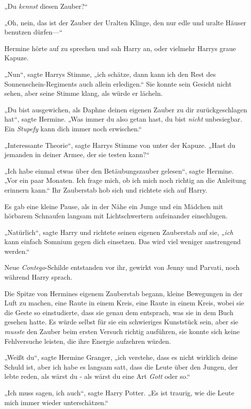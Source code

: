 {„Du \emph{kennst} diesen Zauber?“

„Oh, nein, das ist der Zauber der Uralten Klinge, den nur edle und uralte Häuser benutzen dürfen—“

Hermine hörte auf zu sprechen und sah Harry an, oder vielmehr Harrys graue Kapuze.

„Nun“, sagte Harrys Stimme, „ich schätze, dann kann ich den Rest des Sonnenschein-Regiments auch allein erledigen.“ Sie konnte sein Gesicht nicht sehen, aber seine Stimme klang, als würde er lächeln.

„Du bist ausgewichen, als Daphne deinen eigenen Zauber zu dir zurückgeschlagen hat“, sagte Hermine. „Was immer du also getan hast, du bist \emph{nicht} unbesiegbar. Ein \emph{Stupefy} kann dich immer noch erwischen.“

„Interessante Theorie“, sagte Harrys Stimme von unter der Kapuze. „Hast du jemanden in deiner Armee, der sie testen kann?“

„Ich habe einmal etwas über den Betäubungszauber gelesen“, sagte Hermine. „Vor ein paar Monaten. Ich frage mich, ob ich mich noch richtig an die Anleitung erinnern kann.“ Ihr Zauberstab hob sich und richtete sich auf Harry.

Es gab eine kleine Pause, als in der Nähe ein Junge und ein Mädchen mit hörbarem Schnaufen langsam mit Lichtschwertern aufeinander einschlugen.

„Natürlich“, sagte Harry und richtete seinen eigenen Zauberstab auf sie, „\emph{ich} kann einfach Somnium gegen dich einsetzen. Das wird viel weniger anstrengend werden.“

Neue \emph{Contego}-Schilde entstanden vor ihr, gewirkt von Jenny und Parvati, noch während Harry sprach.

Die Spitze von Hermines eigenem Zauberstab begann, kleine Bewegungen in der Luft zu machen, eine Raute in einem Kreis, eine Raute in einem Kreis, wobei sie die Geste so einstudierte, dass sie genau dem entsprach, was sie in dem Buch gesehen hatte. Es würde selbst für sie ein schwieriges Kunststück sein, aber sie \emph{musste} den Zauber beim ersten Versuch richtig ausführen, sie konnte sich keine Fehlversuche leisten, die ihre Energie aufzehren würden.

„Weißt du“, sagte Hermine Granger, „ich verstehe, dass es nicht wirklich deine Schuld ist, aber ich habe es langsam satt, dass die Leute über den Jungen, der lebte reden, als wärst du - als wärst du eine Art \emph{Gott} oder so.“

„Ich muss sagen, ich auch“, sagte Harry Potter. „Es ist traurig, wie die Leute mich immer wieder unterschätzen.“

}
